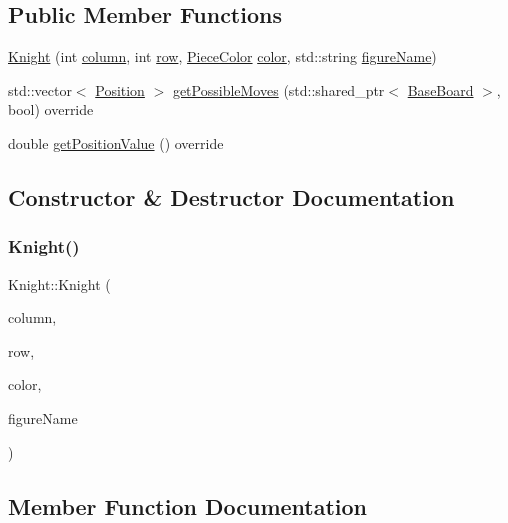 \subsection*{Public Member Functions}
\begin{DoxyCompactItemize}
\item 
\hyperlink{class_knight_ad56d98cc438c67c44d5d18c3a51db1f0}{Knight} (int \hyperlink{class_piece_aa8f39e11280395103164f6ae07398c82}{column}, int \hyperlink{class_piece_ac6ef7c474f20562cb629c2452ce0631d}{row}, \hyperlink{_piece_8h_ad7595c48bb74c0dd2a7648712a2d4985}{Piece\+Color} \hyperlink{class_piece_a8dfe0501fe95a1a7618cf5ad3b9fda69}{color}, std\+::string \hyperlink{class_piece_af2fe809fd0d35d167f2419768e49fd3a}{figure\+Name})
\item 
std\+::vector$<$ \hyperlink{struct_position}{Position} $>$ \hyperlink{class_knight_a65f4e2cdeafefd7e4a7d3c9bca051a5a}{get\+Possible\+Moves} (std\+::shared\+\_\+ptr$<$ \hyperlink{class_base_board}{Base\+Board} $>$, bool) override
\item 
double \hyperlink{class_knight_aa5116e2b3cbbb576283015565b6261a1}{get\+Position\+Value} () override
\end{DoxyCompactItemize}


\subsection{Constructor \& Destructor Documentation}
\mbox{\label{class_knight_ad56d98cc438c67c44d5d18c3a51db1f0}} 
\subsubsection{\texorpdfstring{Knight()}{Knight()}}
{\footnotesize\ttfamily Knight\+::\+Knight (\begin{DoxyParamCaption}\item[{int}]{column,  }\item[{int}]{row,  }\item[{\hyperlink{_piece_8h_ad7595c48bb74c0dd2a7648712a2d4985}{Piece\+Color}}]{color,  }\item[{std\+::string}]{figure\+Name }\end{DoxyParamCaption})\hspace{0.3cm}{\ttfamily [inline]}}



\subsection{Member Function Documentation}
\mbox{\label{class_knight_aa5116e2b3cbbb576283015565b6261a1}} 
